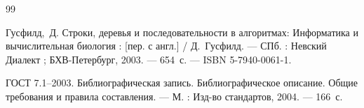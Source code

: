 \begin{thebibliography}{99}

Гусфилд,~Д. Строки, деревья и последовательности в алгоритмах: Информатика и вычислительная биология : [пер. с англ.] / Д.~Гусфилд. --- СПб. : Невский Диалект ; БХВ-Петербург, 2003. --- 654~с. --- ISBN 5-7940-0061-1.

ГОСТ 7.1–2003. Библиографическая запись. Библиографическое описание. Общие требования и правила составления. --- М. : Изд-во стандартов, 2004. --- 166~с.

\end{thebibliography}
\pagebreak